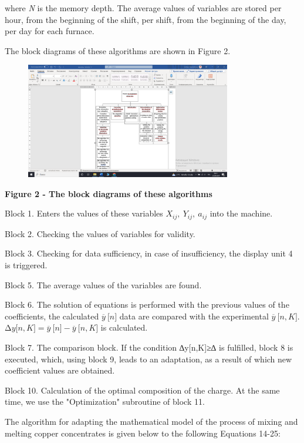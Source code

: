 where \emph{N} is the memory depth. The average values of variables are
stored per hour, from the beginning of the shift, per shift, from the
beginning of the day, per day for each furnace.

The block diagrams of these algorithms are shown in Figure 2.

\begin{figure}[H]
	\centering
	\includegraphics[width=0.8\textwidth]{assets/9}
	\caption*{}
\end{figure}

\textbf{Figure 2 - The block diagrams of these algorithms}

Block 1. Enters the values of these variables
\(X_{ij},\ Y_{ij},\ a_{ij}\) into the machine.

Block 2. Checking the values of variables for validity.

Block 3. Checking for data sufficiency, in case of insufficiency, the
display unit 4 is triggered.

Block 5. The average values of the variables are found.

Block 6. The solution of equations is performed with the previous values
of the coefficients, the calculated \(\overline{y}\ \lbrack n\rbrack\)
data are compared with the experimental
\(\overline{y}\ \lbrack n,K\rbrack\).
\(\mathrm{\Delta}y\lbrack n,K\rbrack = \overline{y}\ \lbrack n\rbrack - \overline{y}\ \lbrack n,K\rbrack\)
is calculated.

Block 7. The comparison block. If the condition
\textbar∆y{[}n,K{]}\textbar≥∆ is fulfilled, block 8 is executed, which,
using block 9, leads to an adaptation, as a result of which new
coefficient values are obtained.

Block 10. Calculation of the optimal composition of the charge. At the
same time, we use the "Optimization" subroutine of block 11.

The algorithm for adapting the mathematical model of the process of
mixing and melting copper concentrates is given below to the following
Equations 14-25:

